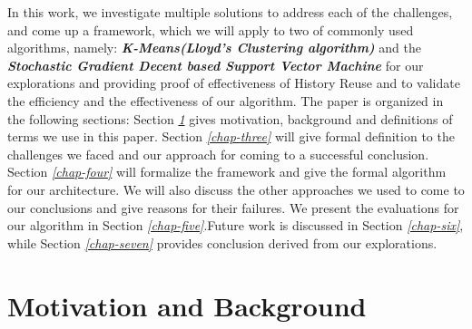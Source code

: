 \documentclass{vldb}
\begin{document}
In this work, we investigate multiple solutions to address each of the challenges, and come up a framework, which we will apply to two of commonly used algorithms, namely: \textbf{\textit{K-Means(Lloyd’s Clustering algorithm)}} and the \textbf{\textit{Stochastic Gradient Decent based Support Vector Machine}} for our explorations and providing proof of effectiveness of History Reuse and to validate the efficiency and the effectiveness of our algorithm.
The paper is organized in the following sections: Section \textit{\ref{chap-two}} gives motivation, background and definitions of terms we use in this paper. Section \textit{\ref{chap-three}} will give formal definition to the challenges we faced and our approach for coming to a successful conclusion. Section \textit{\ref{chap-four}} will formalize the framework and give the formal algorithm for our architecture. We will also discuss the other approaches we used to come to our conclusions and give reasons for their failures. We present the evaluations for our algorithm in Section \textit{\ref{chap-five}}.Future work is discussed in Section \textit{\ref{chap-six}}, while Section \textit{\ref{chap-seven}} provides conclusion derived from our explorations.



\section{Motivation and Background}
\label{chap-two}
\end{document}
